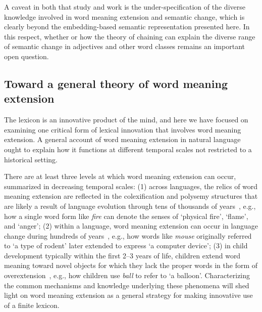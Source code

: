 \documentclass[output=paper]{langsci/langscibook}
\begin{document}
A caveat in both that study and  work is the under-specification of the diverse knowledge involved in word meaning extension and semantic change, which is clearly beyond the embedding-based semantic representation presented here. In this respect, whether or how the theory of chaining can explain the diverse range of semantic change in adjectives and other word classes remains an important open question.


\subsection{Toward a general theory of word meaning extension}

The lexicon is an innovative product of the mind, and here we have focused on examining one critical form of lexical innovation that involves word meaning extension. A general account of word meaning extension in natural language ought to explain how it functions at different temporal scales not restricted to a historical setting.

There are at least three levels at which word meaning extension can occur, summarized in decreasing temporal scales: (1) across languages, the relics of word meaning extension are reflected in the colexification and polysemy structures that are likely a result of language evolution through tens of thousands of years~\citep{francois2008semantic,youn2016universal}, e.g., how a single word form like \textit{fire} can denote the senses of `physical fire', `flame', and `anger'; (2) within a language, word meaning extension can occur in language change during hundreds of years~\citep{sweetser91,traugott2001regularity}, e.g., how words like \textit{mouse} originally referred to `a type of rodent' later extended to express `a computer device'; (3) in child development typically within the first 2--3 years of life, children extend word meaning toward novel objects for which they lack the proper words in the form of overextension~\citep{vygotsky1962language,clark1978strategies,rescorla1980overextension}, e.g., how children use \textit{ball} to refer to `a balloon'. Characterizing the common mechanisms and knowledge underlying these phenomena will shed light on word meaning extension as a general strategy for making innovative use of a finite lexicon.
\end{document}
